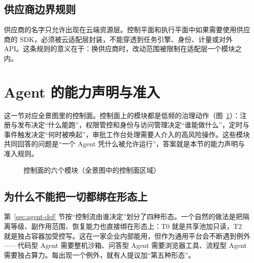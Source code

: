 \subsection{供应商边界规则}

供应商的名字只允许出现在云端资源层。控制平面和执行平面中如果需要使用供应商的 SDK，必须被云适配层封装，不能穿透到任务引擎、身份、计量或对外 API。这条规则的意义在于：换供应商时，改动范围被限制在适配层一个模块之内。

\section{Agent 的能力声明与准入}
\label{sec:profile}

这一节对应全景图里的控制面。控制面上的模块都是低频的治理动作（图~\ref{fig:zoom-control}）：注册与发布决定“什么能跑”，权限管控和身份与访问管理决定“谁能做什么”，定时与事件触发决定“何时被唤起”，审批工作台处理需要人介入的高风险操作。这些模块共同回答的问题是“一个 Agent 凭什么被允许运行”，答案就是本节的能力声明与准入规则。

\begin{figure}[htbp]
\centering
{}
\caption[控制面的六个模块]{控制面的六个模块（全景图中的控制面区域）}
\label{fig:zoom-control}
\end{figure}

\subsection{为什么不能把一切都绑在形态上}

第~\ref{sec:agent-def} 节按“控制流由谁决定”划分了四种形态。一个自然的做法是把隔离等级、副作用范围、恢复能力也直接绑在形态上：T0 就是共享池加只读，T2 就是独占容器加受控写。这在一家企业内部能用，但作为通用平台会不断遇到例外——代码型 Agent 需要整机沙箱、问答型 Agent 需要浏览器工具、流程型 Agent 需要独占算力。每出现一个例外，就有人提议加“第五种形态”。

